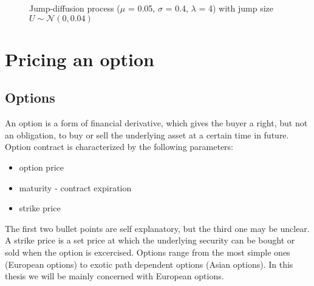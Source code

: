 \documentclass[times, utf8, diplomski]{fer}
\begin{document}
	\begin{figure}[ht]
	\centering
	\caption{Jump-diffusion process ($\mu$ = 0.05, $\sigma$ = 0.4, $\lambda$ = 4) with jump size $U \sim \mathcal{N}(0,0.04)$}
	\label{figure_jump_diffusion}
	\end{figure}

\chapter{Pricing an option}

\section{Options}
An option is a form of financial derivative, which gives the buyer a right, but not an obligation, to buy or sell the underlying asset at a certain time in future. Option contract is characterized by the following parameters:
\begin{itemize}
	\item option price
	\item maturity - contract expiration
	\item strike price
\end{itemize} The first two bullet points are self explanatory, but the third one may be unclear. A strike price is a set price at which the underlying security can be bought or sold when the option is excercised. Options range from the most simple ones (European options) to exotic path dependent options (Asian options). In this thesis we will be mainly concerned with European options.
\end{document}
